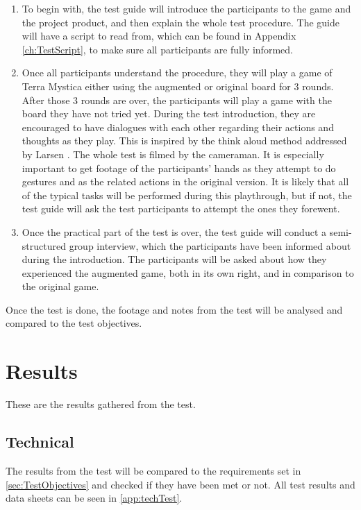\begin{enumerate}
\item To begin with, the test guide will introduce the participants to the game and the project product, and then explain the whole test procedure. The guide will have a script to read from, which can be found in Appendix \ref{ch:TestScript}, to make sure all participants are fully informed.
\item Once all participants understand the procedure, they will play a game of Terra Mystica either using the augmented or original board for 3 rounds. After those 3 rounds are over, the participants will play a game with the board they have not tried yet. During the test introduction, they are encouraged to have dialogues with each other regarding their actions and thoughts as they play. This is inspired by the think aloud method addressed by Larsen \citep{TestingLecture}. The whole test is filmed by the cameraman. It is especially important to get footage of the participants' hands as they attempt to do gestures and as the related actions in the original version. It is likely that all of the typical tasks will be performed during this playthrough, but if not, the test guide will ask the test participants to attempt the ones they forewent.
\item Once the practical part of the test is over, the test guide will conduct a semi-structured group interview, which the participants have been informed about during the introduction. The participants will be asked about how they experienced the augmented game, both in its own right, and in comparison to the original game.
\end{enumerate}

Once the test is done, the footage and notes from the test will be analysed and compared to the test objectives.

\section{Results}
These are the results gathered from the test.

\subsection{Technical}
The results from the test will be compared to the requirements set in \ref{sec:TestObjectives} and checked if they have been met or not. All test results and data sheets can be seen in \ref{app:techTest}.

